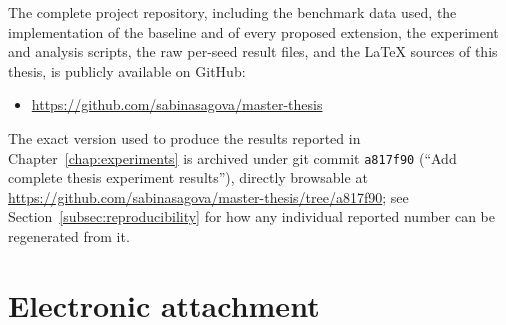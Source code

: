 \documentclass[12pt,a4paper]{report}
\begin{document}
The complete project repository, including the benchmark data used, the
implementation of the baseline and of every proposed extension, the
experiment and analysis scripts, the raw per-seed result files, and the
\LaTeX{} sources of this thesis, is publicly available on GitHub:

\begin{itemize}
  \item \url{https://github.com/sabinasagova/master-thesis}
\end{itemize}

The exact version used to produce the results reported in
Chapter~\ref{chap:experiments} is archived under git commit
\texttt{a817f90} (``Add complete thesis experiment results''),
directly browsable at
\url{https://github.com/sabinasagova/master-thesis/tree/a817f90}; see
Section~\ref{subsec:reproducibility} for how any individual reported
number can be regenerated from it.

\section{Electronic attachment}
\label{att:zip}

\end{document}
